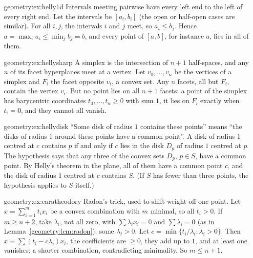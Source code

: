 \begin{solution}{geometry:ex:helly1d}
\idea Intervals meeting pairwise have every left end to the left of every right end.
\writeup Let the intervals be $[a_i,b_i]$ (the open or half-open cases are similar). For all $i,j$, the intervals $i$ and $j$ meet, so $a_i\le b_j$. Hence
$a=\max_ia_i\le\min_jb_j=b$, and every point of $[a,b]$, for instance $a$, lies in all of them.
\end{solution}

\begin{solution}{geometry:ex:hellysharp}
\idea A simplex is the intersection of $n+1$ half-spaces, and any $n$ of its facet hyperplanes meet at a vertex.
\writeup Let $v_0,\dots,v_n$ be the vertices of a simplex and $F_i$ the facet opposite $v_i$, a convex set. Any $n$ facets, all but $F_i$, contain the vertex $v_i$.
But no point lies on all $n+1$ facets: a point of the simplex has barycentric coordinates $t_0,\dots,t_n\ge0$ with sum $1$, it lies on $F_i$ exactly when $t_i=0$,
and they cannot all vanish.
\end{solution}

\begin{solution}{geometry:ex:hellydisk}
\idea ``Some disk of radius $1$ contains these points'' means ``the disks of radius $1$ around these points have a common point''.
\writeup A disk of radius $1$ centred at $c$ contains $p$ if and only if $c$ lies in the disk $D_p$ of radius $1$ centred at $p$. The hypothesis says that any three of the
convex sets $D_p$, $p\in S$, have a common point. By Helly's theorem in the plane, all of them have a common point $c$, and the disk of radius $1$ centred at $c$
contains $S$. (If $S$ has fewer than three points, the hypothesis applies to $S$ itself.)
\end{solution}

\begin{solution}{geometry:ex:caratheodory}
\idea Radon's trick, used to shift weight off one point.
\writeup Let $x=\sum_{i=1}^mt_ix_i$ be a convex combination with $m$ minimal, so all $t_i>0$. If $m\ge n+2$, take $\lambda_i$, not all zero, with $\sum\lambda_ix_i=0$ and
$\sum\lambda_i=0$ (as in Lemma~\ref{geometry:lem:radon}); some $\lambda_i>0$. Let $c=\min\{t_i/\lambda_i:\lambda_i>0\}$. Then $x=\sum(t_i-c\lambda_i)x_i$, the coefficients are
$\ge0$, they add up to $1$, and at least one vanishes: a shorter combination, contradicting minimality. So $m\le n+1$.
\end{solution}

